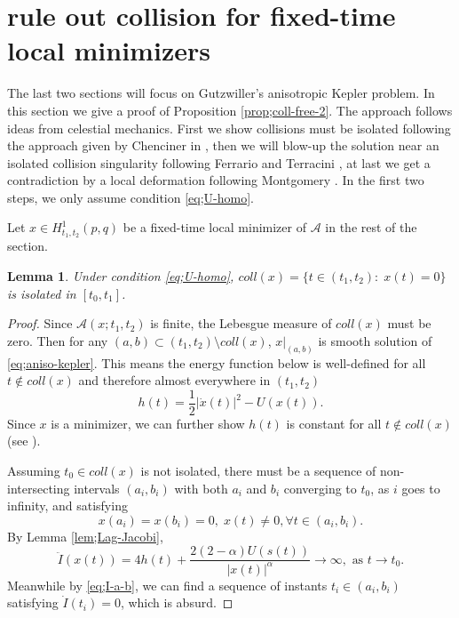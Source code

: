 \documentclass[11pt]{amsart}
\newcommand{\A}{\mathcal A}
\newcommand{\al}{\alpha}
\newcommand{\ey}{\frac{1}{2}}
\theoremstyle{plain}
\newtheorem{lem}{Lemma}[section]
\theoremstyle{definition}
\theoremstyle{remark}
\begin{document}
\section{rule out collision for fixed-time local minimizers} \label{sec;coll-free}

The last two sections will focus on Gutzwiller's anisotropic Kepler problem. In this section we give a proof of Proposition \ref{prop;coll-free-2}. The approach follows ideas from celestial mechanics. First we show collisions must be isolated following the approach given by Chenciner in \cite{C02}, then we will blow-up the solution near an isolated collision singularity following Ferrario and Terracini \cite{FT04}, at last we get a contradiction by a local deformation following Montgomery \cite{Mont99a}. In the first two steps, we only assume condition \eqref{eq;U-homo}. 


Let $x \in H^1_{t_1, t_2}(p, q)$ be a fixed-time local minimizer of $\A$ in the rest of the section.  


\begin{lem} \label{lem;coll-iso} 
Under condition \eqref{eq;U-homo}, $coll(x) = \{ t \in (t_1, t_2): \; x(t) =0\}$ is isolated in $[t_0, t_1]$. 
\end{lem}

\begin{proof}
Since $\A(x; t_1, t_2)$ is finite, the Lebesgue measure of $coll(x)$ must be zero. Then for any $(a, b) \subset (t_1, t_2)\setminus coll(x)$, $x|_{(a, b)}$ is smooth solution of \eqref{eq;aniso-kepler}. This means the energy function below is well-defined for all $t \notin coll(x)$ and therefore almost everywhere in $(t_1, t_2)$
$$ h(t) = \ey |\dot{x}(t)|^2 -U(x(t)). $$ 
Since $x$ is a minimizer, we can further show $h(t)$ is constant for all $t \notin coll(x)$ (see \cite[page 7]{C02}). 

Assuming $t_0 \in coll(x)$ is not isolated, there must be a sequence of non-intersecting intervals $(a_i, b_i)$ with both $a_i$ and $b_i$ converging to $t_0$, as $i$ goes to infinity, and satisfying
\begin{equation}
\label{eq;I-a-b} x(a_i) = x(b_i) =0, \; x(t) \ne 0, \forall t \in (a_i, b_i).
\end{equation}
By Lemma \ref{lem;Lag-Jacobi}, 
$$ \ddot{I}(x(t)) = 4h(t) + \frac{2 (2-\al)U(s(t))}{|x(t)|^{\al}} \to \infty, \text{ as } t \to t_0.$$ 
Meanwhile by \eqref{eq;I-a-b}, we can find a sequence of instants $t_i \in (a_i, b_i)$ satisfying $\dot{I}(t_i) =0$, which is absurd. 
\end{proof}
\end{document}
